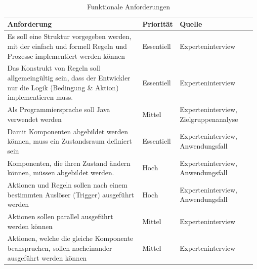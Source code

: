     \begin{table}[hbt!]
        \begin{center}
            \begin{tabular}{| p{10.4cm} | p{2.0cm} | p{3.0cm} | }
                \hline
                   \textbf{Anforderung} & \textbf{Priorität} & \textbf{Quelle} \\
                \hline
                    Es soll eine Struktur vorgegeben werden, mit der einfach und formell Regeln und Prozesse implementiert werden können & Essentiell & Experteninterview \\ 
                \hline
                    Das Konstrukt von Regeln soll allgemeingültig sein, dass der Entwickler nur die Logik (Bedingung \& Aktion) implementieren muss. & Essentiell & Experteninterview \\
                \hline
                    Als Programmiersprache soll Java verwendet werden & Mittel & Experteninterview, Zielgruppenanalyse \\ 
                \hline
                    Damit Komponenten abgebildet werden können, muss ein Zustandsraum definiert sein & Essentiell & Experteninterview, Anwendungsfall \\ 
                \hline
                    Komponenten, die ihren Zustand ändern können, müssen abgebildet werden. & Hoch & Experteninterview, Anwendungsfall \\ 
                \hline
                    Aktionen und Regeln sollen nach einem bestimmten Auslöser (Trigger) ausgeführt werden & Hoch & Experteninterview, Anwendungsfall \\
                \hline
                    Aktionen sollen parallel ausgeführt werden können & Mittel & Experteninterview \\ 
                \hline
                    Aktionen, welche die gleiche Komponente beanspruchen, sollen nacheinander ausgeführt werden können & Mittel & Experteninterview \\
                \hline
            \end{tabular}
        \end{center}
        \caption{Funktionale Anforderungen}
        \label{tab:functionalRequirements}
    \end{table} 


